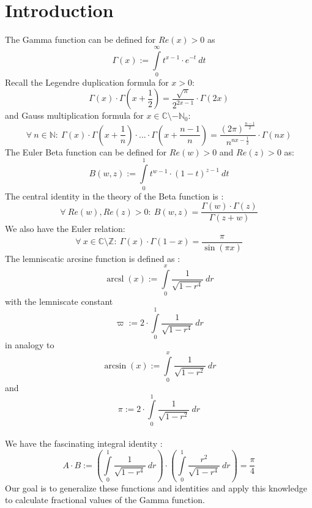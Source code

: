 \documentclass[sn-mathphys]{sn-jnl}%
\theoremstyle{thmstyleone}%
\theoremstyle{thmstyletwo}%
\theoremstyle{thmstylethree}%
\DeclareMathOperator{\arcsl}{arcsl}
\begin{document}
\section{Introduction}\label{sec1}
The Gamma function can be defined for $Re(x) > 0$ as
\begin{equation}
\Gamma(x) := \int \limits_{0}^{\infty} t^{x-1} \cdot e^{-t} \ dt
\end{equation}
Recall the Legendre duplication formula for $x > 0$:
\begin{equation}
\Gamma(x) \cdot \Gamma(x + \frac{1}{2}) = \frac{\sqrt{\pi}}{2^{2x-1}} \cdot \Gamma(2x)
\end{equation}
and Gauss multiplication formula for $x \in \mathbb{C} \setminus -\mathbb{N}_{0}$:
\begin{equation}
\forall \ n \in \mathbb{N}: \ \Gamma(x) \cdot \Gamma(x + \frac{1}{n}) \cdot ... \cdot \Gamma(x + \frac{n-1}{n}) = \frac{(2 \pi)^{\frac{n-1}{2}}}{n^{nx - \frac{1}{2}}} \cdot \Gamma(nx)
\end{equation}
The Euler Beta function can be defined for $Re(w)>0$ and $Re(z)>0$ as:
\begin{equation}
B(w,z) := \int \limits_{0}^{1} t^{w-1} \cdot (1-t)^{z-1} \ dt
\end{equation}
The central identity in the theory of the Beta function is \cite{remmert}:
\begin{equation}
\forall \ Re(w),Re(z) > 0: \ B(w,z) = \frac{\Gamma(w) \cdot \Gamma(z)}{\Gamma(z+w)}
\end{equation}
We also have the Euler relation:
\begin{equation}
\forall \ x \in \mathbb{C} \setminus \mathbb{Z}: \ \Gamma(x) \cdot \Gamma(1-x) = \frac{\pi}{\sin(\pi x)} 
\end{equation}
The lemniscatic arcsine function is defined as \cite{siegel}:
\begin{equation}
\arcsl(x) := \int \limits_{0}^{x} \frac{1}{\sqrt{1-r^4}} \ dr
\end{equation}
with the lemniscate constant
\begin{equation}
\varpi := 2 \cdot \int \limits_{0}^{1} \frac{1}{\sqrt{1-r^4}} \ dr
\end{equation}
in analogy to
\begin{equation}
\arcsin(x) := \int \limits_{0}^{x} \frac{1}{\sqrt{1-r^2}} \ dr
\end{equation}
and
\begin{equation}
\pi := 2 \cdot \int \limits_{0}^{1} \frac{1}{\sqrt{1-r^2}} \ dr
\end{equation} \\
We have the fascinating integral identity \cite{euler}:
\begin{equation}
A \cdot B := (\int \limits_{0}^{1} \frac{1}{\sqrt{1-r^4}} \ dr) \cdot (\int \limits_{0}^{1} \frac{r^2}{\sqrt{1-r^4}} \ dr) = \frac{\pi}{4}
\end{equation} 
Our goal is to generalize these functions and identities and apply this knowledge to calculate fractional values of the Gamma function.\\ \\ \\
\end{document}
